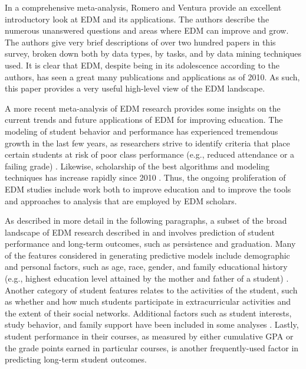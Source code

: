 In a comprehensive meta-analysis, Romero and Ventura \cite{Romero_2010} provide an excellent introductory look at EDM and its applications.  The authors describe the numerous unanswered questions and areas where EDM can improve and grow.  The authors give very brief descriptions of over two hundred papers in this survey, broken down both by data types, by tasks, and by data mining techniques used.  It is clear that EDM, despite being in its adolescence according to the authors, has seen a great many publications and applications as of 2010.  As such, this paper provides a very useful high-level view of the EDM landscape.

A more recent meta-analysis of EDM research \cite{Pena} provides some insights on the current trends and future applications of EDM for improving education.  The modeling of student behavior and performance has experienced tremendous growth in the last few years, as researchers strive to identify criteria that place certain students at risk of poor class performance (e.g., reduced attendance or a failing grade) \cite[Sections 3.1-3.2]{Pena}.  Likewise, scholarship of the best algorithms and modeling techniques has increase rapidly since 2010 \cite[Section 4]{Pena}.  Thus, the ongoing proliferation of EDM studies include work both to improve education and to improve the tools and approaches to analysis that are employed by EDM scholars. 

As described in more detail in the following paragraphs, a subset of the broad landscape of EDM research described in \cite{Romero_2010} and \cite{Pena} involves prediction of student performance and long-term outcomes, such as persistence and graduation.  Many of the features considered in generating predictive models include demographic and personal factors, such as age, race, gender, and family educational history (e.g., highest education level attained by the mother and father of a student) \cite{Shahiri}.  Another category of student features relates to the activities of the student, such as whether and how much students participate in extracurricular activities and the extent of their social networks.  Additional factors such as student interests, study behavior, and family support have been included in some analyses \cite[Section 3.1]{Shahiri}.  Lastly, student performance in their courses, as measured by either cumulative GPA or the grade points earned in particular courses, is another frequently-used factor in predicting long-term student outcomes. 

